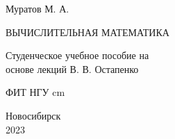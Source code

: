 \documentclass[17pt, a4paper]{extarticle}
\begin{document}
\begin{titlepage}
	\null\vfill

	\begin{center}
		{\large Муратов М. А.}
		\vskip 1cm

		{\huge\MakeUppercase{Вычислительная математика}}
		\vskip 2cm

		{\large Студенческое учебное пособие на\\основе лекций В. В. Остапенко}
	

		\vfill
		\vfill
		ФИТ НГУ
		 cm

		Новосибирск\\2023
	\end{center}
	\hfill
\end{titlepage}
\end{document}
